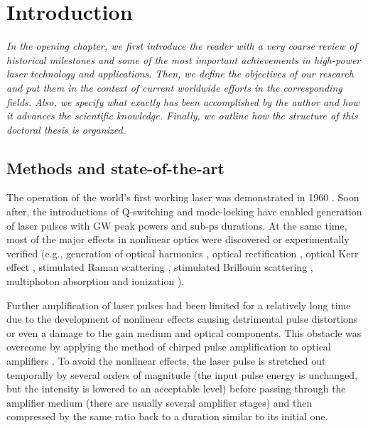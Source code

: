 \documentclass[10pt, a4paper, twoside, openright]{report}
\begin{document}
\chapter{Introduction\label{chap:intro}}
%

\noindent \textsl{In the opening chapter, we first introduce the reader with a very coarse review of historical milestones and some of the most important achievements in high-power laser technology and applications. Then, we define the objectives of our research and put them in the context of current worldwide efforts in the corresponding fields. Also, we specify what exactly has been accomplished by the author and how it advances the scientific knowledge. Finally, we outline how the structure of this doctoral thesis is organized.}

\section{Methods and state-of-the-art}

The operation of the world's first working laser was demonstrated in 1960 \cite{Maiman1960}. Soon after, the introductions of Q-switching \cite{McClung1962} and mode-locking \cite{Mocker1965} have enabled generation of laser pulses with GW peak powers and sub-$ \mathrm{ps} $ durations. At the same time, most of the major effects in nonlinear optics were discovered or experimentally verified (e.g., generation of optical harmonics \cite{Franken1961}, optical rectification \cite{Bass1962}, optical Kerr effect \cite{Armstrong1962, Maker1964}, stimulated Raman scattering \cite{Woodbury1962}, stimulated Brillouin scattering \cite{Chiao1964b, Chiao1964}, multiphoton absorption and ionization \cite{Kaiser1961, Voronov1966}). 

Further amplification of laser pulses had been limited for a relatively long time due to the development of nonlinear effects causing detrimental pulse distortions or even a damage to the gain medium and optical components. This obstacle was overcome by applying the method of chirped pulse amplification to optical amplifiers \cite{Strickland1985, Maine1988}. To avoid the nonlinear effects, the laser pulse is stretched out temporally by several orders of magnitude (the input pulse energy is unchanged, but the intensity is lowered to an acceptable level) before passing through the amplifier medium (there are usually several amplifier stages) and then compressed by the same ratio back to a duration similar to its initial one.
\end{document}
